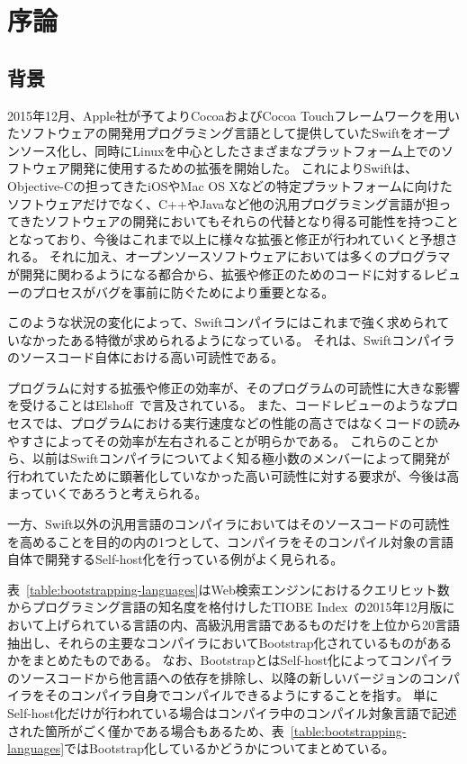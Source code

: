 \chapter{序論}
\label{introduction}

\section{背景}
\label{introduction:background}

2015年12月、Apple社が予てよりCocoaおよびCocoa Touchフレームワークを用いたソフトウェアの開発用プログラミング言語として提供していたSwiftをオープンソース化し、同時にLinuxを中心としたさまざまなプラットフォーム上でのソフトウェア開発に使用するための拡張を開始した。
これによりSwiftは、Objective-Cの担ってきたiOSやMac OS Xなどの特定プラットフォームに向けたソフトウェアだけでなく、C++やJavaなど他の汎用プログラミング言語が担ってきたソフトウェアの開発においてもそれらの代替となり得る可能性を持つこととなっており、今後はこれまで以上に様々な拡張と修正が行われていくと予想される。
それに加え、オープンソースソフトウェアにおいては多くのプログラマが開発に関わるようになる都合から、拡張や修正のためのコードに対するレビューのプロセスがバグを事前に防ぐためにより重要となる。

このような状況の変化によって、Swiftコンパイラにはこれまで強く求められていなかったある特徴が求められるようになっている。
それは、Swiftコンパイラのソースコード自体における高い可読性である。

プログラムに対する拡張や修正の効率が、そのプログラムの可読性に大きな影響を受けることはElshoff~\cite{elshoff}で言及されている。
また、コードレビューのようなプロセスでは、プログラムにおける実行速度などの性能の高さではなくコードの読みやすさによってその効率が左右されることが明らかである。
これらのことから、以前はSwiftコンパイラについてよく知る極小数のメンバーによって開発が行われていたために顕著化していなかった高い可読性に対する要求が、今後は高まっていくであろうと考えられる。

一方、Swift以外の汎用言語のコンパイラにおいてはそのソースコードの可読性を高めることを目的の内の1つとして、コンパイラをそのコンパイル対象の言語自体で開発するSelf-host化を行っている例がよく見られる。

表~\ref{table:bootstrapping-languages}はWeb検索エンジンにおけるクエリヒット数からプログラミング言語の知名度を格付けしたTIOBE Index~\cite{tiobe}の2015年12月版において上げられている言語の内、高級汎用言語であるものだけを上位から20言語抽出し、それらの主要なコンパイラにおいてBootstrap化されているものがあるかをまとめたものである。
なお、BootstrapとはSelf-host化によってコンパイラのソースコードから他言語への依存を排除し、以降の新しいバージョンのコンパイラをそのコンパイラ自身でコンパイルできるようにすることを指す。
単にSelf-host化だけが行われている場合はコンパイラ中のコンパイル対象言語で記述された箇所がごく僅かである場合もあるため、表~\ref{table:bootstrapping-languages}ではBootstrap化しているかどうかについてまとめている。

